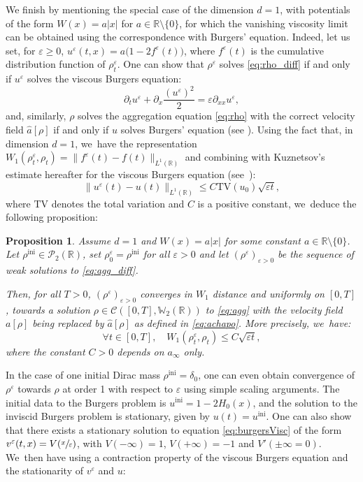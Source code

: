 \documentclass[11pt]{article}
\numberwithin{equation}{section}
\newcommand{\ini}{\mathrm{ini}}
\def\RR{\mathbb{R}}
\def\WW{\mathbb{W}}
\def\eps{\varepsilon}
\def\pa{\partial}
\def\calC{{\mathcal C}}
\def\calP{{\mathcal P}}
\def\achapo{\widehat{a}}
\theoremstyle{plain}
\newtheorem{prop}[theorem]{Proposition}
\theoremstyle{definition}
\begin{document}
We finish by mentioning the special case of the dimension $d = 1$, with potentials of the form $W(x) = a|x|$ for $a\in\RR \setminus \{0\}$, for which the vanishing viscosity limit can be obtained using the correspondence with Burgers' equation. Indeed, let us set, for $\eps \geq 0$, $u^\eps(t,x) = a\big(1 - 2 f^\eps(t)\big)$, where $f^\eps(t)$ is the cumulative distribution function of $\rho^\eps_t$. One can show that $\rho^\eps$ solves \eqref{eq:rho_diff} if and only if $u^\eps$ solves the viscous Burgers equation:
\begin{equation}\label{eq:burgersVisc}
\pa_t u^\eps + \pa_x \frac{(u^\eps)^2}{2} = \eps \pa_{xx} u^\eps,
\end{equation}
and, similarly, $\rho$ solves the aggregation equation \eqref{eq:rho} with the correct velocity field $\achapo[\rho]$ if and only if $u$ solves Burgers' equation (see \cite{bonaschi13, relax21, jv15}). Using the fact that, in dimension $d=1$, we~have the representation $W_1(\rho^\eps_t, \rho_t) = \|f^\eps(t) - f(t)\|_{L^1(\RR)}$ and combining with Kuznetsov's estimate hereafter for the viscous Burgers equation (see~\cite{kuznetsov76}):
\[
\|u^\eps(t) - u(t)\|_{L^1(\RR)} \leq C \mathrm{TV}(u_0) \sqrt{\eps t},
\]
where $\mathrm{TV}$ denotes the total variation and $C$ is a positive constant, we~deduce the following proposition:
\begin{prop}\label{prop:cvViaBurgers}
Assume $d=1$ and $W(x) = a|x|$ for some constant $a\in \RR \setminus \{0\}$. Let $\rho^{\ini} \in \calP_2(\RR)$, set $\rho_0^\eps = \rho^{\ini}$ for all $\eps>0$ and let $(\rho^\eps)_{\eps > 0}$ be the sequence of weak solutions to \eqref{eq:agg_diff}.

Then, for all $T>0$, $(\rho^\eps)_{\eps > 0}$ converges in $W_1$ distance and uniformly on $[0,T]$, towards a solution $\rho \in \calC([0,T], \WW _2(\RR))$ to \eqref{eq:agg} with the velocity field $a[\rho]$ being replaced by $\achapo[\rho]$ as defined in \eqref{eq:achapo}. More precisely, we~have:
\[
\forall t \in [0,T], \quad W_1(\rho_t^\eps, \rho_t) \leq C \sqrt{\eps t},
\]
where the constant $C>0$ depends on $a_\infty$ only.
\end{prop}
In the case of one initial Dirac mass $\rho^{\ini} = \delta_0$, one can even obtain convergence of $\rho^\eps$ towards $\rho$ at order 1 with respect to $\eps$ using simple scaling arguments. The initial data to the Burgers problem is $u^{\ini} = 1 - 2H_0(x)$, and the solution to the inviscid Burgers problem is stationary, given by $u(t) = u^{\ini}$. One can also show that there exists a stationary solution to equation \eqref{eq:burgersVisc} of the form $v^\eps(t,x) = V(\sfrac{x}{\eps})$, with $V(-\infty) = 1$, $V(+\infty) = -1$ and $V'(\pm\infty = 0)$. We~then have using a contraction property of the viscous Burgers equation and the stationarity of $v^\eps$ and $u$:
\end{document}

